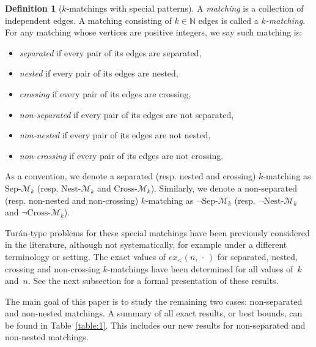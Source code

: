 \documentclass[11pt]{article}
\theoremstyle{definition}
\newtheorem{define}[theorem]{Definition}
\begin{document}
\begin{define}[$k$-matchings with special patterns]
    A {\it matching} is a collection of independent edges.
    A matching consisting of $k\in\mathbb N$ edges is called a {\it $k$-matching}.
    For any matching whose vertices are positive integers, we say such matching is:
    \begin{itemize}[itemsep=0em]
        \item {\it separated} if every pair of its edges are separated,
        \item {\it nested} if every pair of its edges are nested,
        \item {\it crossing} if every pair of its edges are crossing,
        \item {\it non-separated} if every pair of its edges are not separated,
        \item {\it non-nested} if every pair of its edges are not nested,
        \item {\it non-crossing} if every pair of its edges are not crossing.
    \end{itemize}
    As a convention, we denote a separated (resp. nested and crossing) $k$-matching as $\text{Sep-}\mathcal M_k$ (resp. $\text{Nest-}\mathcal M_k$ and $\text{Cross-}\mathcal M_k$).
    Similarly, we denote a non-separated (resp. non-nested and non-crossing) $k$-matching as $\neg\text{Sep-}\mathcal M_k$ (resp. $\neg\text{Nest-}\mathcal M_k$ and $\neg\text{Cross-}\mathcal M_k$).
\end{define}

Tur\'an-type problems for these special matchings have been previously considered in the literature, although not systematically, for example under a different terminology or setting.
The exact values of $ex_<(n,\,\cdot\,)$ for separated, nested, crossing and non-crossing $k$-matchings have been determined for all values of~$k$ and~$n$.
See the next subsection for a formal presentation of these results.

The main goal of this paper is to study the remaining two cases: non-separated and non-nested matchings.
A summary of all exact results, or best bounds, can be found in Table~\ref{table:1}.
This includes our new results for non-separated and non-nested matchings.

\end{document}
